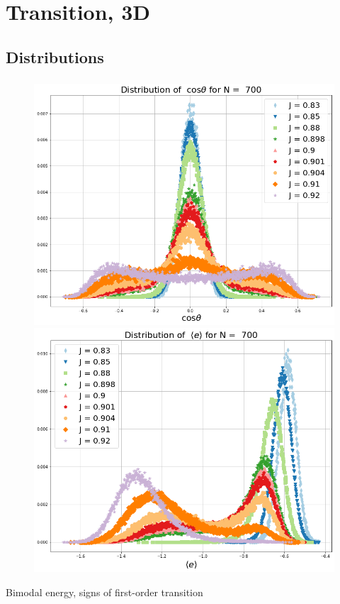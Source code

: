 \documentclass{beamer}
\begin{document}
\section{Transition, 3D}
\subsection{Distributions }
\begin{frame}
	\frametitle{\insertsection}
	\framesubtitle{\insertsubsection}
	\begin{figure}
		\centering
		\includegraphics[scale=0.1825]{Images/distr_cos_700.png}
		\includegraphics[scale=0.1825]{Images/distr_energy_700.png}
		\label{fig:distributions}
	\end{figure}
	
	 \centering	Bimodal energy, signs of first-order transition 
	
\end{frame}
\end{document}
